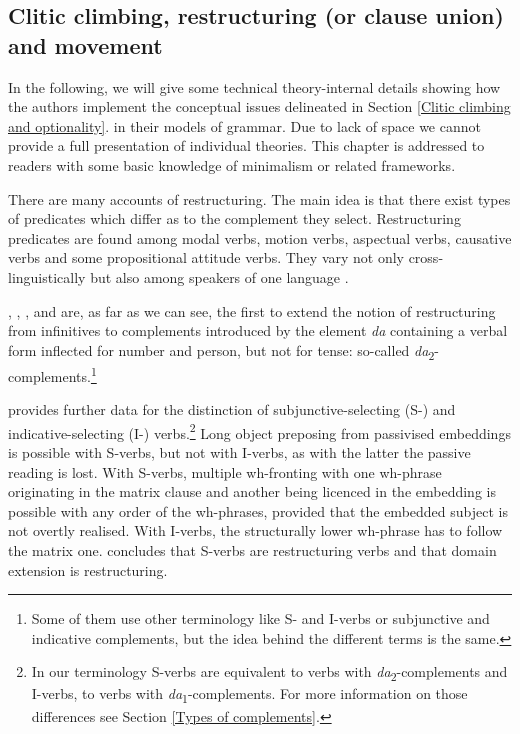 \subsection{Clitic climbing, restructuring (or clause union) and movement}

In the following, we will give some technical theory-internal details showing how the authors implement the conceptual issues delineated in Section \ref{Clitic climbing and optionality}. in their models of grammar. Due to lack of space we cannot provide a full presentation of individual theories. This chapter is addressed to readers with some basic knowledge of minimalism or related frameworks. 

There are many accounts of restructuring. The main idea is that there exist types of predicates which differ as to the complement they select. Restructuring predicates are found among modal verbs, motion verbs, aspectual verbs, causative verbs and some propositional attitude verbs. They vary not only cross-linguistically but also among speakers of one language \citep[cf.][2]{Aljovic05}. 

\citet{Progovac93, Progovac96}, \citet{Stjepanovic04}, \citet{Aljovic04, Aljovic05}, and \citet{Todorovic11, Todorovic12, Todorovic15} are, as far as we can see, the first to extend the notion of restructuring from infinitives to complements introduced by the element \textit{da} containing a verbal form inflected for number and person, but not for tense: so-called \textit{da}\textsubscript{2}-complements.\footnote{Some of them use other terminology like S- and I-verbs or subjunctive and indicative complements, but the idea behind the different terms is the same.}  

\citet[175--179]{Stjepanovic04} provides further data for the distinction of sub\-junctive-se\-lec\-ting (S-) and indicative-selecting (I-) verbs.\footnote{In our terminology S-verbs are equivalent to verbs with \textit{da}\textsubscript{2}-complements and I-verbs, to verbs with \textit{da}\textsubscript{1}-complements. For more information on those differences see Section \ref{Types of complements}.} Long object preposing from passivised embeddings is possible with S-verbs, but not with I-verbs, as with the latter the passive reading is lost. With S-verbs, multiple wh-fronting with one wh-phrase originating in the matrix clause and another being licenced in the embedding is possible with any order of the wh-phrases, provided that the embedded subject is not overtly realised. With I-verbs, the structurally lower wh-phrase has to follow the matrix one. \citet[179]{Stjepanovic04} concludes that S-verbs are restructuring verbs and that domain extension is restructuring. 

